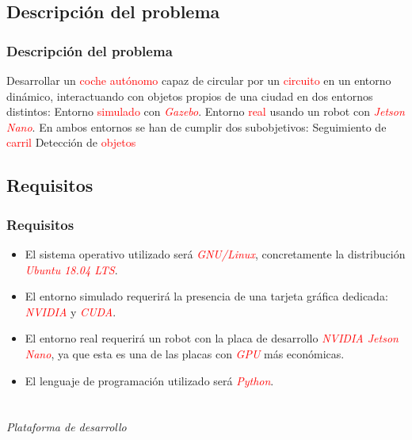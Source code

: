 \documentclass{beamer}
\begin{document}
\subsection{Descripción del problema}
\begin{frame}
	\frametitle{Descripción del problema}
	\begin{outline}
		\1 Desarrollar un \textcolor{red}{coche autónomo }capaz de circular por un \textcolor{red}{circuito} en un entorno dinámico, interactuando con objetos propios de
		una ciudad en dos entornos
		distintos:
		\2 Entorno \textcolor{red}{simulado} con \textcolor{red}{\textit{Gazebo}}.
		\2 Entorno \textcolor{red}{real} usando un robot con \textcolor{red}{\textit{Jetson Nano}}.
		\1 En ambos entornos se han de cumplir dos subobjetivos:
		\2 Seguimiento de \textcolor{red}{carril}
		\2 Detección de \textcolor{red}{objetos}
	\end{outline}
\end{frame}

\subsection{Requisitos}
\begin{frame}
	\frametitle{Requisitos}
	\begin{itemize}
		\item El sistema operativo utilizado será \textcolor{red}{\textit{GNU/Linux}}, concretamente la distribución \textcolor{red}{\textit{Ubuntu 18.04 LTS}}.
		\item El entorno simulado requerirá la presencia de una tarjeta gráfica dedicada: \textcolor{red}{\textit{NVIDIA}} y \textcolor{red}{\textit{CUDA}}.
		\item El entorno real requerirá un robot con la placa de desarrollo \textcolor{red}{\textit{NVIDIA Jetson Nano}}, ya que esta es una de las placas con
		      \textcolor{red}{\textit{GPU}} más económicas.
		\item El lenguaje de programación utilizado será \textcolor{red}{\textit{Python}}.
	\end{itemize}
\end{frame}


\section*{}
\begin{frame}{}
	\centering \Huge
	\emph{Plataforma de desarrollo}
\end{frame}
\end{document}
